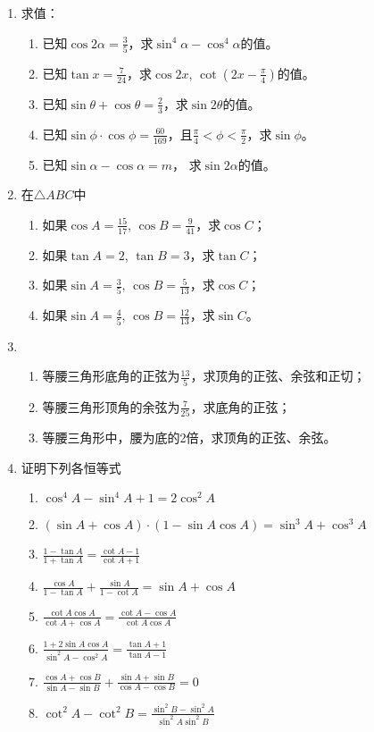 \begin{enumerate}
    \item 求值：
\begin{enumerate}
    \item 已知$\cos2\alpha=\frac{3}{5}$，求$\sin^4\alpha-\cos^4\alpha$的值。
    \item 已知$\tan x=\frac{7}{24}$，求$\cos2x$, $\cot\left(2x-\frac{\pi}{4}\right)$的值。
    \item 已知$\sin\theta+\cos\theta=\frac{2}{3}$，求$\sin2\theta$的值。
    \item 已知$\sin\phi\cdot \cos\phi=\frac{60}{169}$，且$\frac{\pi}{4}<\phi<\frac{\pi}{2}$，求$\sin\phi$。
    \item 已知$\sin\alpha-\cos\alpha=m$， 求$\sin2\alpha$的值。
\end{enumerate}

\item 在$\triangle ABC$中
\begin{enumerate}
    \item 如果$\cos A=\frac{15}{17}$, $\cos B=\frac{9}{41}$，求$\cos C$；
    \item 如果$\tan A=2$, $\tan B=3$，求$\tan C$；
    \item 如果$\sin A=\frac{3}{5}$, $\cos B=\frac{5}{13}$，求$\cos C$；
    \item 如果$\sin A=\frac{4}{5}$, $\cos B=\frac{12}{13}$，求$\sin C$。
\end{enumerate}

\item \begin{enumerate}
    \item 等腰三角形底角的正弦为$\frac{13}{5}$，求顶角的正弦、余弦和正切；
    \item 等腰三角形顶角的余弦为$\frac{7}{25}$，求底角的正弦；
    \item 等腰三角形中，腰为底的2倍，求顶角的正弦、余弦。
\end{enumerate}

\item 证明下列各恒等式
\begin{enumerate}
    \item $\cos ^{4} A-\sin ^{4} A+1=2 \cos ^{2} A$
    \item $(\sin A+\cos A) \cdot(1-\sin A \cos A)=\sin ^{3} A+\cos ^{3} A$
    \item $\frac{1-\tan A}{1+\tan A}=\frac{\cot A-1}{\cot A+1}$
    \item $\frac{\cos A}{1-\tan A}+\frac{\sin A}{1-\cot A}=\sin A+\cos A$
    \item $\frac{\cot A \cos A}{\cot A+\cos A}=\frac{\cot A-\cos A}{\cot A \cos A}$
    \item $\frac{1+2 \sin A \cos A}{\sin ^{2} A-\cos ^{2} A}=\frac{\tan A+1}{\tan A-1}$
    \item $\frac{\cos A+\cos B}{\sin A-\sin B}+\frac{\sin A+\sin B}{\cos A-\cos B}=0$
    \item $\cot^{2} A-\cot^{2} B=\frac{\sin ^{2} B-\sin ^{2} A}{\sin ^{2} A \sin ^{2} B}$
\end{enumerate}


\end{enumerate}
